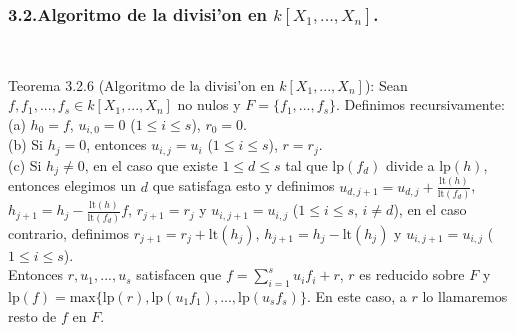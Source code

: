 \documentclass[10pt]{beamer}
\renewcommand{\lp}{\text{lp}}
\renewcommand{\lt}{\text{lt}}
\begin{document}
\begin{frame}
\frametitle{3.2.Algoritmo de la divisi'on en $k[X_1,...,X_n]$.}\\
\begin{block}{Teorema 3.2.6 (Algoritmo de la divisi'on en $k[X_1,...,X_n]$):}
Sean $f,f_1,...,f_s \in k[X_1,...,X_n]$ no nulos y $F=\{f_1,...,f_s\}$. Definimos recursivamente:\\
(a) $h_0=f$, $u_{i,0}=0$ ($1 \leq i \leq s$), $r_0=0$.\\
(b) Si $h_j=0$, entonces $u_{i,j}=u_i$ ($1 \leq i \leq s$), $r=r_j$.\\
(c) Si $h_j \not = 0$, en el caso que existe $1 \leq d \leq s$ tal que $\lp(f_d)$ divide a $\lp(h)$, entonces elegimos un $d$ que satisfaga esto y definimos $u_{d,j+1}=u_{d,j}+\frac{\lt(h)}{\lt(f_d)}$, $h_{j+1}=h_{j}-\frac{\lt(h)}{\lt(f_d)}f$, $r_{j+1}=r_j$ y $u_{i,j+1}=u_{i,j}$ ($1\leq i \leq s$, $i \not = d$), en el caso contrario, definimos $r_{j+1}=r_j+\lt(h_j)$, $h_{j+1}=h_j-\lt(h_j)$ y $u_{i,j+1}=u_{i,j}$ ($1 \leq i \leq s$).\\
Entonces $r,u_1,...,u_s$ satisfacen que $f= \sum^{s}_{i=1}{u_if_i} +r$, $r$ es reducido sobre $F$ y 
$\lp (f)= \text{max}\{\lp(r),\lp(u_1f_1),...,\lp(u_sf_s)\}$. En este caso, a $r$ lo llamaremos resto de $f$ en $F$.\\
\end{block}
\vspace{5cm}
\end{frame}
\end{document}
